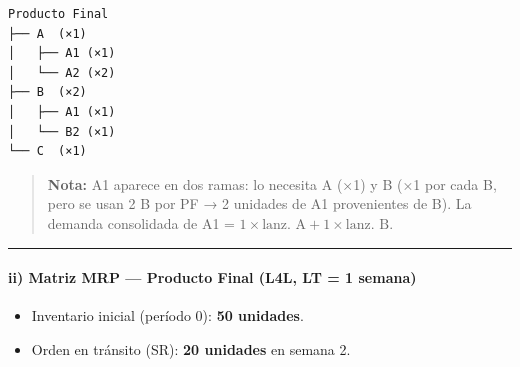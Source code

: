 \documentclass[
]{article}
\providecommand{\tightlist}{%
  \setlength{\itemsep}{0pt}\setlength{\parskip}{0pt}}
\begin{document}
\begin{verbatim}
Producto Final
├── A  (×1)
│   ├── A1 (×1)
│   └── A2 (×2)
├── B  (×2)
│   ├── A1 (×1)
│   └── B2 (×1)
└── C  (×1)
\end{verbatim}

\begin{quote}
\textbf{Nota:} A1 aparece en dos ramas: lo necesita A (×1) y B (×1 por
cada B, pero se usan 2 B por PF → 2 unidades de A1 provenientes de B).
La demanda consolidada de A1 =
\(1 \times \text{lanz. A} + 1 \times \text{lanz. B}\).
\end{quote}

\begin{center}\rule{0.5\linewidth}{0.5pt}\end{center}

\hypertarget{ii-matriz-mrp-producto-final-l4l-lt-1-semana}{%
\paragraph{ii) Matriz MRP --- Producto Final (L4L, LT = 1
semana)}\label{ii-matriz-mrp-producto-final-l4l-lt-1-semana}}

\begin{itemize}
\tightlist
\item
  Inventario inicial (período 0): \textbf{50 unidades}.
\item
  Orden en tránsito (SR): \textbf{20 unidades} en semana 2.
\end{itemize}
\end{document}
